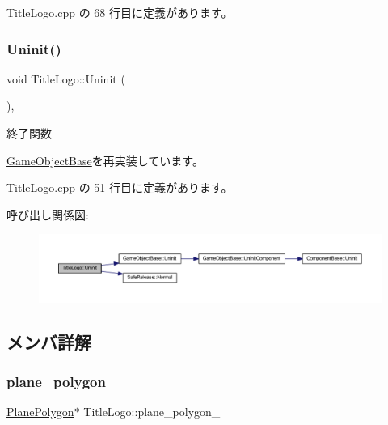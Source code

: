  Title\+Logo.\+cpp の 68 行目に定義があります。

\mbox{\label{class_title_logo_a177943b3becc80fcdb7a34f131b07ee9}} 
\subsubsection{\texorpdfstring{Uninit()}{Uninit()}}
{\footnotesize\ttfamily void Title\+Logo\+::\+Uninit (\begin{DoxyParamCaption}{ }\end{DoxyParamCaption})\hspace{0.3cm}{\ttfamily [override]}, {\ttfamily [virtual]}}



終了関数 



\mbox{\hyperlink{class_game_object_base_a97e1bc277d7b1c0156d4735de29a022c}{Game\+Object\+Base}}を再実装しています。



 Title\+Logo.\+cpp の 51 行目に定義があります。

呼び出し関係図\+:\nopagebreak
\begin{figure}[H]
\begin{center}
\leavevmode
\includegraphics[width=350pt]{class_title_logo_a177943b3becc80fcdb7a34f131b07ee9_cgraph}
\end{center}
\end{figure}


\subsection{メンバ詳解}
\mbox{\label{class_title_logo_a842ef60ff79632e1dad76599952eb95a}} 
\subsubsection{\texorpdfstring{plane\+\_\+polygon\+\_\+}{plane\_polygon\_}}
{\footnotesize\ttfamily \mbox{\hyperlink{class_plane_polygon}{Plane\+Polygon}}$\ast$ Title\+Logo\+::plane\+\_\+polygon\+\_\+}



